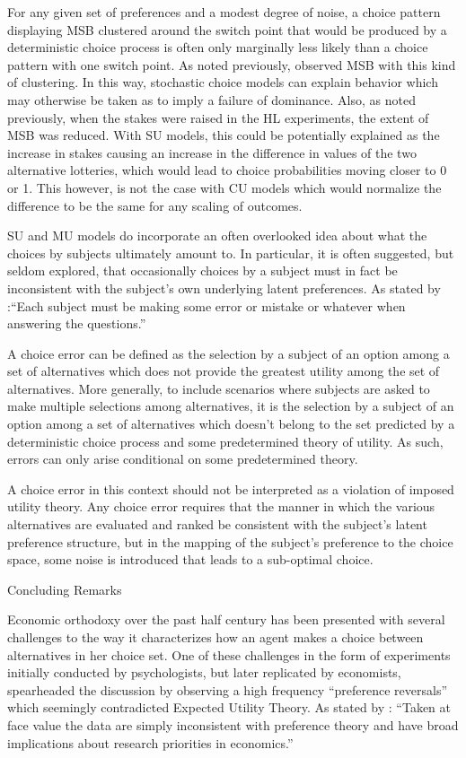 \documentclass[../main.tex]{subfiles}
\begin{document}
For any given set of preferences and a modest degree of noise, a choice pattern displaying MSB clustered around the switch point that would be produced by a deterministic choice process is often only marginally less likely than a choice pattern with one switch point.
As noted previously, \textcite[1648]{Holt2002} observed MSB with this kind of clustering.
In this way, stochastic choice models can explain behavior which may otherwise be taken as to imply a failure of dominance.
Also, as noted previously, when the stakes were raised in the HL experiments, the extent of MSB was reduced.
With SU models, this could be potentially explained as the increase in stakes causing an increase in the difference in values of the two alternative lotteries, which would lead to choice probabilities moving closer to 0 or 1.
This however, is not the case with CU models which would normalize the difference to be the same for any scaling of outcomes.


SU and MU models do incorporate an often overlooked idea about what the choices by subjects ultimately amount to.
In particular, it is often suggested, but seldom explored, that occasionally choices by a subject must in fact be inconsistent with the subject's own underlying latent preferences.
As stated by \textcite{Holt1986}⁠:\enquote{Each subject must be making some error or mistake or whatever when answering the questions.}

A choice error can be defined as the selection by a subject of an option among a set of alternatives which does not provide the greatest utility among the set of alternatives.
More generally, to include scenarios where subjects are asked to make multiple selections among alternatives, it is the selection by a subject of an option among a set of alternatives which doesn't belong to the set predicted by a deterministic choice process and some predetermined theory of utility.
As such, errors can only arise conditional on some predetermined theory.


A choice error in this context should not be interpreted as a violation of imposed utility theory.
Any choice error requires that the manner in which the various alternatives are evaluated and ranked be consistent with the subject's latent preference structure, but in the mapping of the subject's preference to the choice space, some noise is introduced that leads to a sub-optimal choice.


Concluding Remarks

Economic orthodoxy over the past half century has been presented with several challenges to the way it characterizes how an agent makes a choice between alternatives in her choice set.
One of these challenges in the form of experiments initially conducted by psychologists, but later replicated by economists, spearheaded the discussion by observing a high frequency \enquote{preference reversals} which seemingly contradicted Expected Utility Theory.
As stated by \textcite{Grether1979}: \enquote{Taken at face value the data are simply inconsistent with preference theory and have broad implications about research priorities in economics.}
\end{document}
